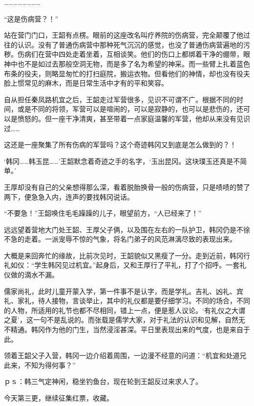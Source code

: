 ……………………

“这是伤病营？！”

站在营门门口，王韶有点楞。眼前的这座改名叫疗养院的伤病营，完全颠覆了他过往的认识。没有了普通伤病营中那种死气沉沉的感觉，也没了普通伤病营遍地的污秽。伤病们在营中四处走着坐着，互相谈笑。他们的伤口上都绑着干净的绷带，眼神中也不是如过去那般空洞无物，而是多了名为希望的神采。而一些臂上扎着蓝色布条的役夫，则略显匆忙的打扫庭院，搬运衣物。但看他们的神情，却也没有役夫脸上惯常见的麻木，而是日常生活中才有的平和笑容。

自从担任秦凤路机宜之后，王韶走过军营很多，见识不可谓不广。根据不同的时间，或是不同的将领，军营可以是喧闹的，可以是寂静的，也可以是悲伤的，还可以是愤怒的。但一座干净清爽，甚至带着一点家庭温馨的军营，他却从来没有见识过……

这还是一座聚集了所有伤病的军营吗？这个奇迹韩冈又到底是怎么做到的？！

‘韩冈……韩玉昆……’王韶默念着奇迹之手的名字，‘玉出昆冈。这块璞玉还真是不简单。’

王厚却没有自己的父亲想得那么深，看着脱胎换骨一般的伤病营，只是啧啧的赞了两下，便急急入内，连声的要找韩冈说话。

“不要急！”王韶唤住毛毛躁躁的儿子，眼望前方，“人已经来了！”

远远望着营地大门处王韶、王厚父子俩，以及围在左右的一队护卫，韩冈仍是不徐不急的走着。一派宠辱不惊的气象，将名门弟子的风范淋漓尽致的表现出来。

大概是来回奔忙的缘故，比前次见时，王韶貌似又黑瘦了一分。走到近前，韩冈行礼如仪：“学生韩冈见过机宜。”起身后，又和王厚行了平礼，打了个招呼。一套礼仪做的滴水不漏。

儒家尚礼，此时儿童开蒙入学，第一件事不是认字，而是学礼。吉礼、凶礼、宾礼、家礼，待人接物，言谈举止，其中的礼仪都是要仔细学习。不同的场合，不同的人物，所适用的礼节也都不尽相同，错上一点，便是惹人议论。‘有礼仪之大谓之夏’，这一句不是乱说的。而张载是儒学大家，对于礼法的认识和见解，自然无不精通。韩冈作为他的门生，当然浸淫甚深。平日里表现出来的气度，也是来自于此。

领着王韶父子入营，韩冈一边介绍着周围，一边漫不经意的问道：“机宜和处道兄此来，不知为得何事？”

ｐｓ：韩三气定神闲，稳坐钓鱼台，现在轮到王韶反过来求人了。

今天第三更，继续征集红票，收藏。

